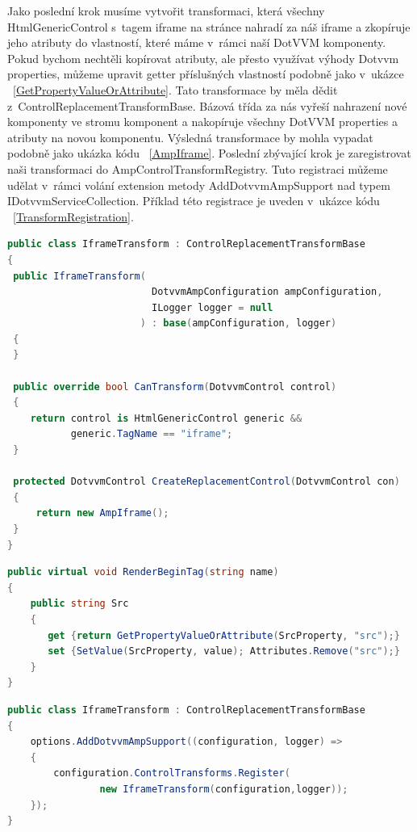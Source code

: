 Jako poslední krok musíme vytvořit transformaci, která všechny HtmlGenericControl s~tagem iframe na stránce nahradí za náš iframe a zkopíruje jeho atributy do vlastností, které máme v~rámci naší DotVVM komponenty. Pokud bychom nechtěli kopírovat atributy, ale přesto využívat výhody Dotvvm properties, můžeme upravit getter příslušných vlastností podobně jako v~ukázce ~\ref{GetPropertyValueOrAttribute}.  Tato transformace by měla dědit z~ControlReplacementTransformBase. Bázová třída za nás vyřeší nahrazení nové komponenty ve stromu komponent a nakopíruje všechny DotVVM properties a atributy na novou komponentu. Výsledná transformace by mohla vypadat podobně jako ukázka kódu  ~\ref{AmpIframe}. Poslední zbývající krok je zaregistrovat naši transformaci do AmpControlTransformRegistry. Tuto registraci můžeme udělat v~rámci volání extension metody AddDotvvmAmpSupport nad typem IDotvvmServiceCollection. Příklad této registrace je uveden v~ukázce kódu ~\ref{TransformRegistration}.
\begin{lstlisting}[language=c#, caption=Ukázka možné implementace tranformace pro iframe,label=AmpIframe,captionpos=t]
public class IframeTransform : ControlReplacementTransformBase
{
 public IframeTransform(
                         DotvvmAmpConfiguration ampConfiguration,
                         ILogger logger = null
                       ) : base(ampConfiguration, logger)
 {
 }

 public override bool CanTransform(DotvvmControl control)
 {
    return control is HtmlGenericControl generic &&
           generic.TagName == "iframe";
 }

 protected DotvvmControl CreateReplacementControl(DotvvmControl con)
 {
     return new AmpIframe();
 }
}
\end{lstlisting}

\begin{lstlisting}[language=c#, caption=Možný způsob jak se vyhnout kopírování HTML atributů do DotVVM property. ,label=GetPropertyValueOrAttribute,captionpos=t]
public virtual void RenderBeginTag(string name)
{
    public string Src
    {
       get {return GetPropertyValueOrAttribute(SrcProperty, "src");}
       set {SetValue(SrcProperty, value); Attributes.Remove("src");}
    }
}
\end{lstlisting}

    \begin{lstlisting}[language=c#, caption=Ukázka možné implementace tranformace pro iframe,label=TransformRegistration,captionpos=t]
public class IframeTransform : ControlReplacementTransformBase
{
    options.AddDotvvmAmpSupport((configuration, logger) =>
    {
        configuration.ControlTransforms.Register(
                new IframeTransform(configuration,logger));
    });
}
\end{lstlisting}

